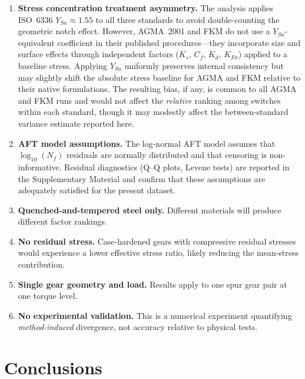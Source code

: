 \documentclass[12pt,a4paper]{article}
\begin{document}
\begin{enumerate}
  \item \textbf{Stress concentration treatment asymmetry.} The analysis
        applies ISO~6336 $Y_{Sa} \approx 1.55$ to all three standards to
        avoid double-counting the geometric notch effect. However, AGMA~2001
        and FKM do not use a $Y_{Sa}$-equivalent coefficient in their
        published procedures---they incorporate size and surface effects
        through independent factors ($K_s$, $C_f$, $K_d$, $K_{F\sigma}$)
        applied to a baseline stress. Applying $Y_{Sa}$ uniformly preserves
        internal consistency but may slightly shift the absolute stress
        baseline for AGMA and FKM relative to their native formulations.
        The resulting bias, if any, is common to all AGMA and FKM runs and
        would not affect the \emph{relative} ranking among switches within
        each standard, though it may modestly affect the between-standard
        variance estimate reported here.
  \item \textbf{AFT model assumptions.} The log-normal AFT model
        assumes that $\log_{10}(N_f)$ residuals are normally
        distributed and that censoring is non-informative. Residual
        diagnostics (Q--Q plots, Levene tests) are reported in the
        Supplementary Material and confirm that these assumptions
        are adequately satisfied for the present dataset.
  \item \textbf{Quenched-and-tempered steel only.} Different materials
        will produce different factor rankings.
  \item \textbf{No residual stress.} Case-hardened gears with compressive
        residual stresses would experience a lower effective stress ratio,
        likely reducing the mean-stress contribution.
  \item \textbf{Single gear geometry and load.} Results apply to one spur
        gear pair at one torque level.
  \item \textbf{No experimental validation.} This is a numerical
        experiment quantifying \emph{method-induced} divergence, not
        accuracy relative to physical tests.
\end{enumerate}

\section{Conclusions}
\label{sec:conclusions}
\end{document}
